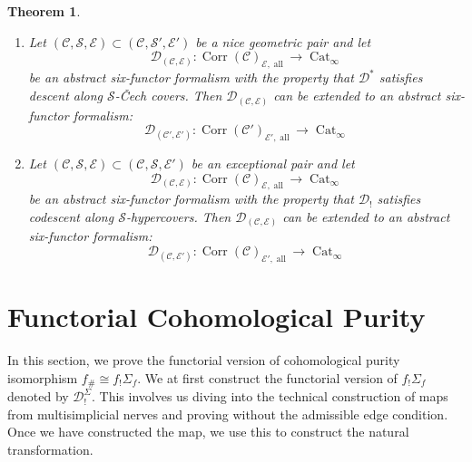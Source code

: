 \documentclass[14pt]{article}
\newtheorem{theorem}{Theorem}[subsection]
\theoremstyle{definition}
\newcommand{\CrrCpEal}{\op{Corr}(\Ca)_{\E,\op{all}}}
\newcommand{\E}{\mathcal{E}}
\newcommand{\D}{\mathcal{D}}
\newcommand{\op}[1]{\operatorname{#1}}
\renewcommand{\S}{\mathcal{S}}
\newcommand{\Ca}{\mathcal{C}}
\numberwithin{subsection}{section}
\begin{document}
\begin{theorem}\label{Theorem:extensionalonggeometricandexceptionalpairs}
    \begin{enumerate}
        \item Let $(\Ca,\S,\E) \subset (\Ca,\S',\E')$ be a nice geometric pair and let 
        \begin{equation}
            \D_{(\Ca,\E)} : \CrrCpEal \to \op{Cat}_{\infty}
        \end{equation}
        be an abstract six-functor formalism with the property that $\D^*$ satisfies descent along $\S$-\v{C}ech covers. Then $\D_{(\Ca,\E)}$ can be extended to an abstract six-functor formalism:
        \begin{equation}
            \D_{(\Ca',\E')} : \op{Corr}(\Ca')_{\E',\op{all}} \to \op{Cat}_{\infty}
        \end{equation}
        \item Let $(\Ca,\S,\E) \subset (\Ca,\S,\E')$ be an exceptional pair and let 
        \begin{equation}
            \D_{(\Ca,\E)} : \CrrCpEal \to \op{Cat}_{\infty}
        \end{equation}
        be an abstract six-functor formalism with the property that $\D_!$ satisfies codescent along $\S$-hypercovers. Then $\D_{(\Ca,\E)}$ can be extended to an abstract six-functor formalism:
        \begin{equation}
            \D_{(\Ca,\E')} : \op{Corr}(\Ca)_{\E',\op{all}} \to \op{Cat}_{\infty}
        \end{equation}
    \end{enumerate}
\end{theorem}







\section{Functorial Cohomological Purity}
In this section, we prove the functorial version of cohomological purity isomorphism $f_{\#} \cong  f_!\Sigma_f$. We at first construct the functorial version of $f_!\Sigma_f$ denoted by $\D^{\Sigma}_!$. This involves us diving into the technical construction of maps from multisimplicial nerves and proving \cite[Theorem 1.0.5]{chowdhury2025sixfunctorformalismsii} without the admissible edge condition. Once we have constructed the map, we use this to construct the natural transformation.
\end{document}
